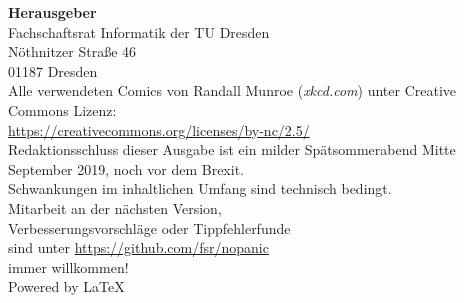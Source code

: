 \newpage
\thispagestyle{empty} %
\color{white}

\begin{minipage}[t][\textheight][b]{.65\textwidth}
\footnotesize
\textbf{Herausgeber} \\
Fachschaftsrat Informatik der TU Dresden\\
Nöthnitzer Straße 46\\
01187 Dresden\\[1\baselineskip]

Alle verwendeten Comics von Randall Munroe (\textit{xkcd.com}) unter Creative Commons Lizenz:\\
\url{https://creativecommons.org/licenses/by-nc/2.5/}\\[1\baselineskip]

Redaktionsschluss dieser Ausgabe ist ein milder Spätsommerabend Mitte September 2019, noch vor dem Brexit.\\%
Schwankungen im inhaltlichen Umfang sind technisch bedingt.\\[1\baselineskip]

Mitarbeit an der nächsten Version,\\
Verbesserungsvorschläge oder Tippfehlerfunde\\
sind unter \url{https://github.com/fsr/nopanic}\\
immer willkommen!\\[1\baselineskip]

Powered by \LaTeX
\end{minipage}%
\hfill%

